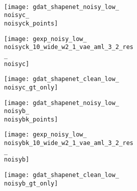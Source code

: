 \begin{figure}[t]
{\begin{subfigure}[t]{0.5\textwidth}
   		\\[-4px]
   		\begin{subfigure}[t]{0.15\textwidth}
   			\vspace{0px}\centering
   			\texttt{[image: gdat\_shapenet\_noisy\_low\_\\noisyc\_\\noisyck\_points]}
   		\end{subfigure}
   		\begin{subfigure}[t]{0.15\textwidth}
   			\vspace{0px}\centering
   			\texttt{[image: gexp\_noisy\_low\_\\noisyck\_10\_wide\_w2\_1\_vae\_aml\_3\_2\_res\_\\noisyc]}
   		\end{subfigure}
   		\begin{subfigure}[t]{0.15\textwidth}
   			\vspace{0px}\centering
   			\texttt{[image: gdat\_shapenet\_clean\_low\_\\noisyc\_gt\_only]}
   		\end{subfigure}
   		\begin{subfigure}[t]{0.15\textwidth}
   			\vspace{0px}\centering
   			\texttt{[image: gdat\_shapenet\_noisy\_low\_\\noisyb\_\\noisybk\_points]}
   		\end{subfigure}
   		\begin{subfigure}[t]{0.15\textwidth}
   			\vspace{0px}\centering
   			\texttt{[image: gexp\_noisy\_low\_\\noisybk\_10\_wide\_w2\_1\_vae\_aml\_3\_2\_res\_\\noisyb]}
   		\end{subfigure}
   		\begin{subfigure}[t]{0.15\textwidth}
   			\vspace{0px}\centering
   			\texttt{[image: gdat\_shapenet\_clean\_low\_\\noisyb\_gt\_only]}
   		\end{subfigure}

\end{subfigure}}
\end{figure}
